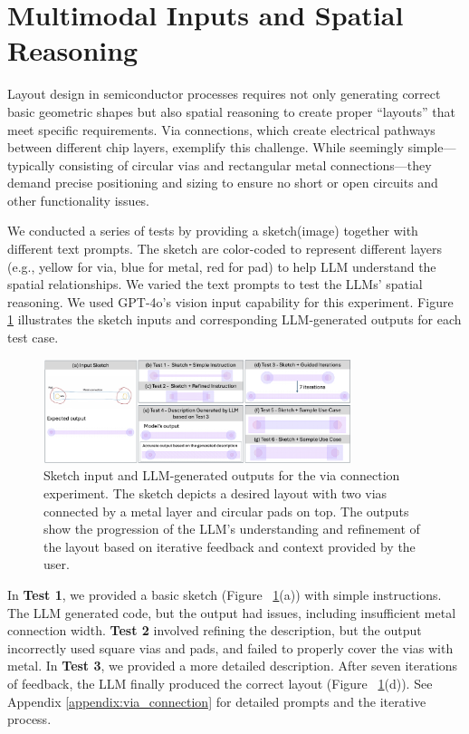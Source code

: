 \documentclass{article}
\begin{document}
\section{Multimodal Inputs and Spatial Reasoning}
Layout design in semiconductor processes requires not only generating correct basic geometric shapes but also spatial reasoning to create proper ``layouts'' that meet specific requirements. Via connections, which create electrical pathways between different chip layers, exemplify this challenge. While seemingly simple—typically consisting of circular vias and rectangular metal connections—they demand precise positioning and sizing to ensure no short or open circuits and other functionality issues.

We conducted a series of tests by providing a sketch(image) together with different text prompts. The sketch are color-coded to represent different layers (e.g., yellow for via, blue for metal, red for pad) to help LLM understand the spatial relationships. We varied the text prompts to test the LLMs' spatial reasoning. We used GPT-4o's vision input capability for this experiment. Figure \ref{fig:via_experiment} illustrates the sketch inputs and corresponding LLM-generated outputs for each test case.
\begin{figure}[h]
\centering
\includegraphics[width=0.8\textwidth]{Figure1_v5.png}
\caption{Sketch input and LLM-generated outputs for the via connection experiment. The sketch depicts a desired layout with two vias connected by a metal layer and circular pads on top. The outputs show the progression of the LLM's understanding and refinement of the layout based on iterative feedback and context provided by the user.}
\label{fig:via_experiment}
\end{figure}
In \textbf{Test 1}, we provided a basic sketch (Figure ~\ref{fig:via_experiment}(a)) with simple instructions. The LLM generated code, but the output had issues, including insufficient metal connection width. \textbf{Test 2} involved refining the description, but the output incorrectly used square vias and pads, and failed to properly cover the vias with metal. In \textbf{Test 3}, we provided a more detailed description. After seven iterations of feedback, the LLM finally produced the correct layout (Figure ~\ref{fig:via_experiment}(d)). See Appendix \ref{appendix:via_connection} for detailed prompts and the iterative process.
\end{document}
